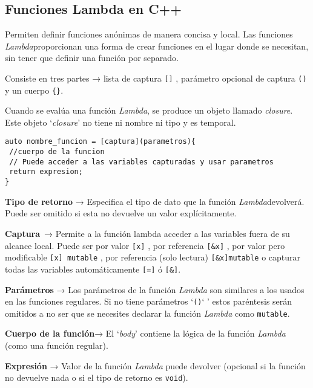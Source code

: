 \subsection{Funciones Lambda en C++}
Permiten definir funciones anónimas de manera concisa y local. Las funciones \textit{Lambda}proporcionan una forma de crear funciones en el lugar donde se necesitan,
sin tener que definir una función por separado.

Consiste en tres partes → lista de captura \texttt{[]} , parámetro opcional de captura \texttt{()} y un cuerpo \texttt{\{\}}.

Cuando se evalúa una función \textit{Lambda}, se produce un objeto llamado \textit{closure}. Este objeto ‘\textit{closure}’ no tiene ni nombre ni tipo y es temporal.
\begin{center}
	\begin{lstlisting}[frame=single]
auto nombre_funcion = [captura](parametros){
 //cuerpo de la funcion
 // Puede acceder a las variables capturadas y usar parametros
 return expresion;
}
	\end{lstlisting}
\end{center}

\textbf{Tipo de retorno} → Especifica el tipo de dato que la función \textit{Lambda}devolverá. Puede ser omitido si esta no devuelve un valor explícitamente.

\textbf{Captura} → Permite a la función lambda acceder a las variables fuera de su alcance local. Puede ser por valor \texttt{[x]} , por referencia \texttt{[\&x]} , por valor pero modificable \texttt{[x] mutable} , por referencia (solo lectura) \texttt{[\&x]mutable} o capturar todas las variables automáticamente \texttt{[=]} ó \texttt{[\&]}.

\textbf{Parámetros} → Los parámetros de la función \textit{Lambda} son similares a los usados en las funciones regulares. Si no tiene parámetros ‘\texttt{()}` ’ estos paréntesis serán omitidos a no ser que se necesites declarar la función \textit{Lambda} como \texttt{mutable}.

\textbf{Cuerpo de la función}→ El ‘\textit{body}’ contiene la lógica de la función \textit{Lambda} (como una función regular).

\textbf{Expresión} → Valor de la función \textit{Lambda} puede devolver (opcional si la función no devuelve nada o si el tipo de retorno es \texttt{void}).


